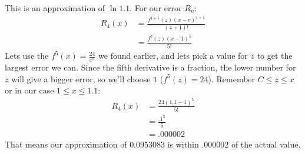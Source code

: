 \documentclass{report}
\begin{document}
        This is an approximation of \(\ln 1.1\).
        For our error \(R_n\):
        \begin{align*}
            R_4(x) &= \frac{f^{4+1}(z) (x-c)^{4+1}}{(4+1)!} \\
            &= \frac{f^5(z)(x-1)^5}{5!}
        \end{align*}
        Lets use the \(f^5(x) = \frac{24}{x^5}\) we found earlier, and lets pick a value for \(z\) to get the largest error we can.
        Since the fifth derivative is a fraction, the lower number for \(z\) will give a bigger error, so we'll choose \(1\) (\(f^5(z) = 24\)).
        Remember \(C \leq z \leq x\) or in our case \(1 \leq x \leq 1.1\):
        \begin{align*}
            R_4(x) &= \frac{24(1.1-1)^5}{5!} \\
            &= \frac{.1^5}{5} \\
            &= .000002
        \end{align*}
        That means our approximation of \(0.0953083\) is within \(.000002\) of the actual value.
    
\end{document}
